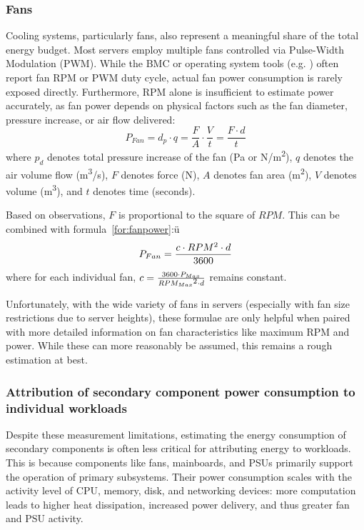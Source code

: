 \subsubsection{Fans}
Cooling systems, particularly fans, also represent a meaningful share of the total energy budget. Most servers employ multiple fans controlled via Pulse-Width Modulation (PWM). While the BMC or operating system tools (e.g. ) often report fan RPM or PWM duty cycle, actual fan power consumption is rarely exposed directly. Furthermore, RPM alone is insufficient to estimate power accurately, as fan power depends on physical factors such as the fan diameter, pressure increase, or air flow delivered\parencite{basmadjianCloudComputingIts2012}:
\begin{equation}
\label{for:fanpower}
    P_{Fan} = d_p \cdot q = \frac{F}{A} \cdot \frac{V}{t} = \frac{F \cdot d}{t}
\end{equation}
where $p_d$ denotes total pressure increase of the fan (Pa or N/m\textsuperscript{2}), $q$ denotes the air volume flow (m\textsuperscript{3}/s), $F$ denotes force (N), $A$ denotes fan area (m\textsuperscript{2}), $V$ denotes volume (m\textsuperscript{3}), and $t$ denotes time (seconds).

Based on observations, $F$ is proportional to the square of $RPM$. This can be combined with formula~\ref{for:fanpower}:ü
\begin{equation}
    P_{Fan} = \frac{c \cdot RPM\textsuperscript{2} \cdot d}{3600}
\end{equation}
where for each individual fan, $c = \frac{3600 \cdot P_{Max}}{RPM_{Max}\textsuperscript{2} \cdot d}$ remains constant.

Unfortunately, with the wide variety of fans in servers (especially with fan size restrictions due to server heights), these formulae are only helpful when paired with more detailed information on fan characteristics like maximum RPM and power. While these can more reasonably be assumed, this remains a rough estimation at best.

\subsubsection{Attribution of secondary component power consumption to individual workloads}
Despite these measurement limitations, estimating the energy consumption of secondary components is often less critical for attributing energy to workloads. This is because components like fans, mainboards, and PSUs primarily support the operation of primary subsystems. Their power consumption scales with the activity level of CPU, memory, disk, and networking devices: more computation leads to higher heat dissipation, increased power delivery, and thus greater fan and PSU activity.

